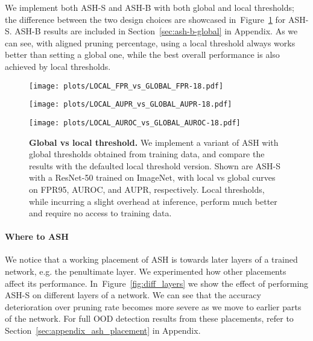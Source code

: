 \documentclass{article}
\newcommand{\figlabel}[1]{\label{fig:#1}}
\newcommand{\figref}[1]{Figure~\ref{fig:#1}}
\newcommand{\secref}[1]{Section~\ref{sec:#1}}
\begin{document}
We implement both ASH-S and ASH-B with both global and local thresholds; the difference between the two design choices are showcased in~\figref{global_vs_local} for ASH-S. ASH-B results are included in \secref{ash-b-global} in Appendix. As we can see, with aligned pruning percentage, using a local threshold always works better than setting a global one, while the best overall performance is also achieved by local thresholds. 



\begin{figure}[hbt!]
 \centering
\begin{minipage}[b]{0.28\textwidth}
        \captionsetup{labelformat=empty}
\texttt{[image: plots/LOCAL\_FPR\_vs\_GLOBAL\_FPR-18.pdf]}
\subcaption{}{}
    \end{minipage}
\begin{minipage}[b]{0.28\textwidth}
        \captionsetup{labelformat=empty}
       

        \texttt{[image: plots/LOCAL\_AUPR\_vs\_GLOBAL\_AUPR-18.pdf]}
\subcaption{}{}
    \end{minipage}
\begin{minipage}[b]{0.28\textwidth}
        \captionsetup{labelformat=empty}
\texttt{[image: plots/LOCAL\_AUROC\_vs\_GLOBAL\_AUROC-18.pdf]}
\subcaption{}{}
    \end{minipage}
\caption{\textbf{Global vs local threshold.} We implement a variant of ASH with global thresholds obtained from training data, and compare the results with the defaulted local threshold version. Shown are ASH-S with a ResNet-50 trained on ImageNet, with local vs global curves on FPR95, AUROC, and AUPR, respectively. Local thresholds, while incurring a slight overhead at inference, perform much better and require no access to training data.
    }
    \figlabel{global_vs_local}
\end{figure}

\paragraph{Where to ASH} We notice that a working placement of ASH is towards later layers of a trained network, e.g. the penultimate layer. We experimented how other placements affect its performance. In~\figref{diff_layers} we show the effect of performing ASH-S on different layers of a network. We can see that the accuracy deterioration over pruning rate becomes more severe as we move to earlier parts of the network. For full OOD detection results from these placements, refer to \secref{appendix_ash_placement} in Appendix. 
\end{document}
